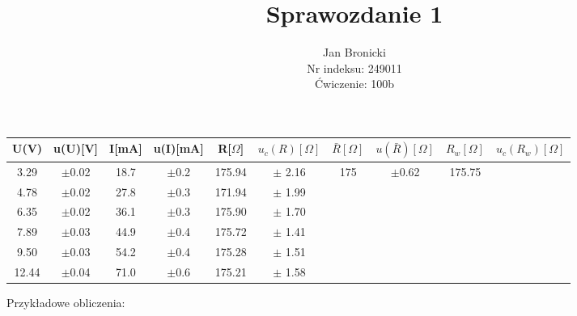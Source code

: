 \documentclass{article}
\title{Sprawozdanie 1}
\author{Jan Bronicki \\
Nr indeksu: 249011\\
Ćwiczenie: 100b}
\date{}
\begin{document}
\maketitle



\begin{center}
    \renewcommand{\arraystretch}{1.3}
\begin{tabular}{ |c|c|c|c|c|c|c|c|c|c| }
    \hline
    U(V)&u(U)[V]&I[mA]&u(I)[mA]&R[$\Omega$]&$u_c(R)[\Omega]$&$\bar{R}[\Omega]$&$u(\bar{R})[\Omega]$&$R_w[\Omega]$&$u_c(R_w)[\Omega]$ \\
    \hline \hline
    3.29&$\pm$0.02&18.7&$\pm$0.2&175.94&$\pm$ 2.16& \multirow{6}{*}{175}&\multirow{6}{*}{$\pm$0.62}&\multirow{6}{*}{175.75}&\\ 
    \cline{1-6}

    4.78&$\pm$0.02&27.8&$\pm$0.3&171.94&$\pm$ 1.99&&&&\\ 
    \cline{1-6}
  
    6.35&$\pm$0.02&36.1&$\pm$0.3&175.90&$\pm$ 1.70&&&&\\ 
    \cline{1-6}

    7.89&$\pm$0.03&44.9&$\pm$0.4&175.72&$\pm$ 1.41&&&&\\ 
    \cline{1-6}

    9.50&$\pm$0.03&54.2&$\pm$0.4&175.28&$\pm$ 1.51&&&&\\ 
    \cline{1-6}
    
    12.44&$\pm$0.04&71.0&$\pm$0.6&175.21&$\pm$ 1.58&&&&\\ 
    \hline
\end{tabular}
\label{tabular: t}
\end{center}
Przykładowe obliczenia:
\end{document}
